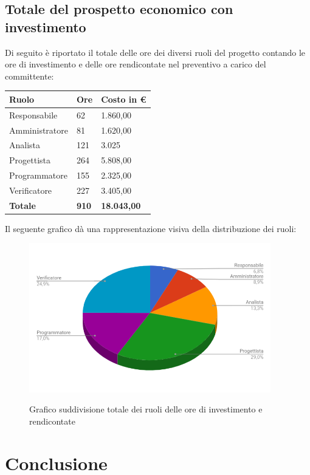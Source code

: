 \documentclass[PianoDiProgetto.tex]{subfiles}
\begin{document}
\subsection{Totale del prospetto economico con investimento}
Di seguito è riportato il totale delle ore dei diversi ruoli del progetto contando le ore di investimento e delle ore rendicontate nel preventivo a carico del committente:
\begin{center}
	\begin{table}[htbp]
		\centering
		\renewcommand\arraystretch{1.5}
		\begin{tabularx}{\textwidth}{p{5cm}|p{4cm}|p{4cm}}
			\hline
			\textbf{Ruolo} & \textbf{Ore} & \textbf{Costo in \euro} \\
			\hline
			Responsabile & 62 & 1.860,00 \\
			\hline
			Amministratore & 81 & 1.620,00 \\
			\hline
			Analista & 121 & 3.025 \\
			\hline
			Progettista & 264 & 5.808,00 \\
			\hline
			Programmatore & 155 & 2.325,00 \\
			\hline
			Verificatore & 227 & 3.405,00 \\
			\hline
			\textbf{Totale} & \textbf{910} & \textbf{18.043,00}\\
			\hline
		\end{tabularx}
	\end{table} 
\end{center}
Il seguente grafico dà una rappresentazione visiva della distribuzione dei ruoli:
\begin{figure}[h]
	\centering
	\includegraphics[width=10.5cm]{images/prospettoEconomico/totInv.png}
	\label{fig:foo}
	\caption{Grafico suddivisione totale dei ruoli delle ore di investimento e rendicontate}
\end{figure} 
\clearpage
\section{Conclusione}
\end{document}
